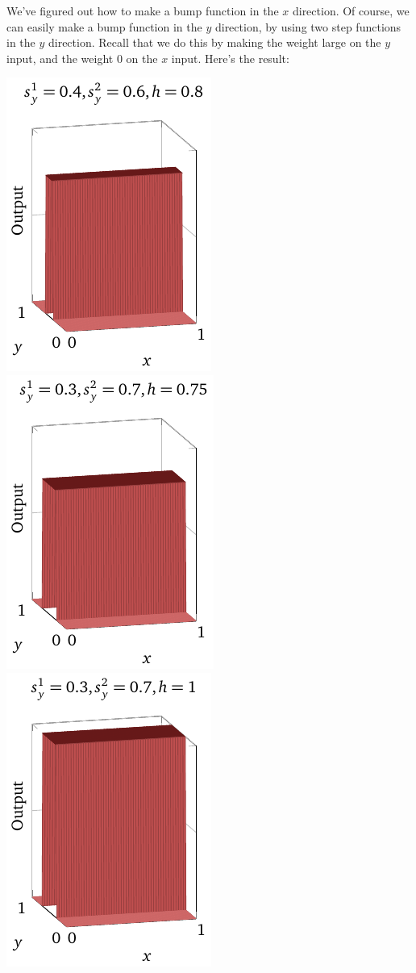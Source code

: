 \documentclass[a4paper,twoside,10pt]{book}
\begin{document}
We've figured out how to make a bump function in the $x$ direction. Of course, we can easily make a bump function in the $y$ direction, by using two step functions in the $y$ direction. Recall that we do this by making the weight large on the $y$ input, and the weight 0 on the $x$ input. Here's the result:
\begin{center}
	\includegraphics[width=0.32\linewidth]{./figures/ch4/3d/bumpy1}
	\includegraphics[width=0.32\linewidth]{./figures/ch4/3d/bumpy2}
	\includegraphics[width=0.32\linewidth]{./figures/ch4/3d/bumpy3}

\end{center}
\end{document}
